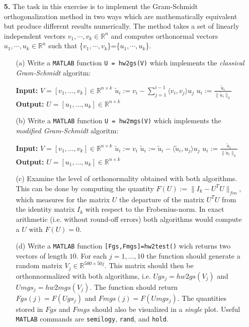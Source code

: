 \documentclass[10pt]{report}
\begin{document}
\begin{enumerate}
\pagebreak

 \item[\textbf{5.}]
 The task in this exercise is to implement the Gram-Schmidt
  orthogonalization method in two ways which are mathematically equivalent but
  produce different results numerically. The method takes a set of linearly
  independent vectors $v_1,\cdots,v_k\in\mathbb{R}^n$ and computes
  orthonormal vectors $u_1,\cdots,u_k\in\mathbb{R}^n$ such that 
  \{$v_1,\cdots,v_k$\}=\{$u_1,\cdots,u_k$\}. 
  \begin{enumerate}

    \item[(a)] Write a \verb+MATLAB+ function \verb+U = hw2gs(V)+ which
    implements the \textit{classical Gram-Schmidt} algoritm:
    \begin{algorithmic}
    \State \textbf{Input:} $V=[v_1,\ldots,v_k]\in\mathbb{R}^{n\times k}$ 
    \State $\tilde{u}_i:=v_i-\sum_{j=1}^{i-1}\langle v_i,v_j\rangle u_j$ 
    \State $u_i:=\frac{\tilde{u}_i}{\|\tilde{u}_i\|_2}$
    \EndFor
    \State \textbf{Output:} $U=[u_1,\ldots,u_k]\in\mathbb{R}^{n\times k}$ 
    \end{algorithmic}

    \item[(b)] Write a \verb+MATLAB+ function \verb+U = hw2mgs(V)+ which
    implements the \textit{modified Gram-Schmidt} algoritm:
    \begin{algorithmic}
    \State \textbf{Input:} $V=[v_1,\ldots,v_k]\in\mathbb{R}^{n\times k}$ 
    \State $\tilde{u}_i:=v_i$
    \State $\tilde{u}_i:=\tilde{u}_i-\langle \tilde{u}_i,u_j\rangle u_j$ 
    \EndFor
    \State $u_i:=\frac{\tilde{u}_i}{\|\tilde{u}_i\|_2}$
    \EndFor
    \State \textbf{Output:} $U=[u_1,\ldots,u_k]\in\mathbb{R}^{n\times k}$ 
    \end{algorithmic}
          
    \item[(c)] Examine the level of orthonormality obtained with both
    algorithms.
    This can be done by computing the quantity $F(U):=\|I_k-U^TU\|_{fro}$, which
    measures for the matrix $U$ the departure of the matrix $U^TU$ from the
    identity matrix $I_k$ with respect to the Frobenius-norm. In exact
    arithmetic (i.e. without round-off errors) both algorithms would compute
    a $U$ with $F(U)=0$.

    \item[(d)] Write a \verb+MATLAB+ function \verb+[Fgs,Fmgs]=hw2test()+ wich
    returns two vectors of length $10$. For each $j=1,\ldots,10$ the function
    should generate a random matrix $V_j\in\mathbb{R}^{500\times50j}$. This
    matrix should then be orthonnormalized with both algorithms, i.e.
    $Ugs_j=hw2gs(V_j)$ and $Umgs_j=hw2mgs(V_j)$. The function should return
    $Fgs(j)=F(Ugs_j)$ and $Fmgs(j)=F(Umgs_j)$. The quantities stored in $Fgs$
    and $Fmgs$ should also be visualized in a \textit{single} plot. Useful \verb+MATLAB+ commands are \verb+semilogy+, \verb+rand+, and \verb+hold+.
\end{enumerate}
\end{enumerate}
\end{document}
